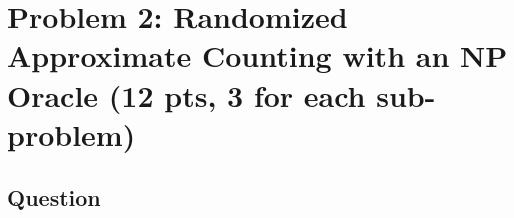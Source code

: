 \documentclass{article}
\newcommand{\DTIME}{\mathbf{DTIME}}
\newcommand{\SIZE}{\mathbf{SIZE}}
\begin{document}



\newpage
\section*{Problem 2: Randomized Approximate Counting with an NP Oracle (12 pts, 3 for each sub-problem)}

\subsection*{Question}
\end{document}
